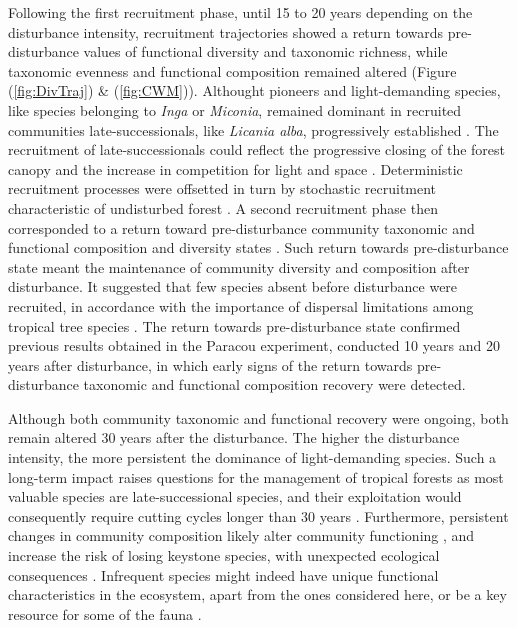 \documentclass[fleqn,10pt]{ArtEcoFoG} %
\begin{document}
Following the first recruitment phase, until 15 to 20 years depending on the disturbance intensity, recruitment trajectories showed a return towards pre-disturbance values of functional diversity and taxonomic richness, while taxonomic evenness and functional composition remained altered (Figure (\ref{fig:DivTraj}) \& (\ref{fig:CWM})).
Althought pioneers and light-demanding species, like species belonging to \emph{Inga} or \emph{Miconia}, remained dominant in recruited communities late-successionals, like \emph{Licania alba}, progressively established \citep{Fortunel2014}.
The recruitment of late-successionals could reflect the progressive closing of the forest canopy and the increase in competition for light and space \citep{Peet1992, Denslow2000}. Deterministic recruitment processes were offsetted in turn by stochastic recruitment characteristic of undisturbed forest \citep{Lawton1988, Chave2004}.
A second recruitment phase then corresponded to a return toward pre-disturbance community taxonomic and functional composition and diversity states \citep{Fukami2005, Fortunel2014}.
Such return towards pre-disturbance state meant the maintenance of community diversity and composition after disturbance. It suggested that few species absent before disturbance were recruited, in accordance with the importance of dispersal limitations among tropical tree species \citep{Svenning2005}.
The return towards pre-disturbance state confirmed previous results obtained in the Paracou experiment, conducted 10 years \citep{Molino2001} and 20 years \citep{Baraloto2012a} after disturbance, in which early signs of the return towards pre-disturbance taxonomic and functional composition recovery were detected.

Although both community taxonomic and functional recovery were ongoing, both remain altered 30 years after the disturbance.
The higher the disturbance intensity, the more persistent the dominance of light-demanding species. Such a long-term impact raises questions for the management of tropical forests as most valuable species are late-successional species, and their exploitation would consequently require cutting cycles longer than 30 years \citep{Putz2012}.
Furthermore, persistent changes in community composition likely alter community functioning \citep{Diaz2005}, and increase the risk of losing keystone species, with unexpected ecological consequences \citep{Jones1994, Chazdon2003a}.
Infrequent species might indeed have unique functional characteristics in the ecosystem, apart from the ones considered here, or be a key resource for some of the fauna \citep{Schleuning2016}.
\end{document}
